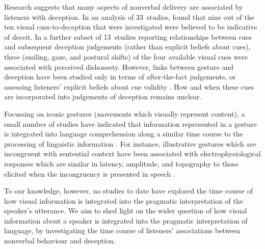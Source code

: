 \documentclass[a4paper,man,natbib]{apa6}
\begin{document}
Research suggests that many aspects of nonverbal delivery are associated by listeners with deception. 
In an analysis of 33~studies, \citet{Zuckerman1981} found that nine out of the ten visual cues-to-deception that were investigated were believed to be indicative of deceit. 
In a further subset of 13~studies reporting relationships between cues and subsequent deception judgements (rather than explicit beliefs about cues), three (smiling, gaze, and postural shifts) of the four available visual cues were associated with perceived dishonesty.
However, links between gesture and deception have been studied only in terms of after-the-fact judgements, or assessing listeners' explicit beliefs about cue validity \citep[See][]{Vrij1996a, Zuckerman1981a}.
How and when these cues are incorporated into judgements of deception remains unclear. 

Focussing on iconic gestures (movements which visually represent content), a small number of studies have indicated that information represented in a gesture is integrated into language comprehension along a similar time course to the processing of linguistic information \citep[See e.g.][]{Ozyurek2007, Kelly2004}. 
For instance, illustrative gestures which are incongruent with sentential context have been associated with electrophysiological responses which are similar in latency, amplitude, and topography to those elicited when the incongruency is presented in speech \citep{Ozyurek2007}.

To our knowledge, however, no studies to date have explored the time course of how visual information is integrated into the pragmatic interpretation of the speaker's utterance.
We aim to shed light on the wider question of how visual information about a speaker is integrated into the pragmatic interpretation of language, by investigating the time course of listeners' associations between nonverbal behaviour and deception.




\end{document}
